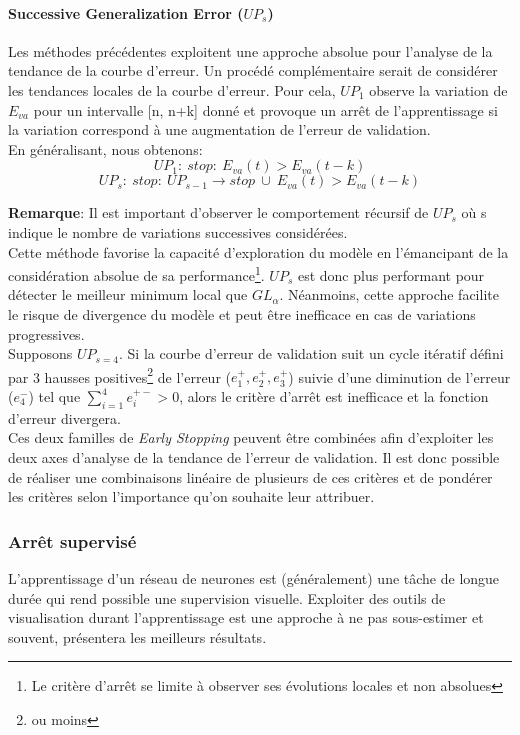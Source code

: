 \paragraph{Successive Generalization Error ($UP_s$)}
Les méthodes précédentes exploitent une approche absolue pour l'analyse de la tendance de la courbe d'erreur. Un procédé complémentaire serait de considérer les tendances locales de la courbe d'erreur. Pour cela, $UP_1$ observe la variation de $E_{va}$ pour un intervalle [n, n+k] donné et provoque un arrêt de l'apprentissage si la variation correspond à une augmentation de l'erreur de validation.\\

\noindent En généralisant, nous obtenons:
$$UP_1: \ stop: \ E_{va}(t) > E_{va}(t-k)$$
$$UP_s: \ stop: \ UP_{s-1} \rightarrow stop \ \cup \ E_{va}(t) > E_{va}(t-k)$$

\noindent \textbf{Remarque}: Il est important d'observer le comportement récursif de $UP_s$ où s indique le nombre de variations successives considérées.\\

\noindent Cette méthode favorise la capacité d'exploration du modèle en l'émancipant de la considération absolue de sa performance\footnote{Le critère d'arrêt se limite à observer ses évolutions locales et non absolues}. $UP_s$ est donc plus performant pour détecter le meilleur minimum local que $GL_{\alpha}$. Néanmoins, cette approche facilite le risque de divergence du modèle et peut être inefficace en cas de variations progressives.\\

\noindent Supposons $UP_{s=4}$. Si la courbe d'erreur de validation suit un cycle itératif défini par 3 hausses positives\footnote{ou moins} de l'erreur ($e_1^+, e_2^+, e_3^+$) suivie d'une diminution de l'erreur ($e_4^-$) tel que $\sum_{i=1}^4 e_i^{+-}>0$, alors le critère d'arrêt est inefficace et la fonction d'erreur divergera.\\

\noindent Ces deux familles de \textit{Early Stopping} peuvent être combinées afin d'exploiter les deux axes d'analyse de la tendance de l'erreur de validation. Il est donc possible de réaliser une combinaisons linéaire de plusieurs de ces critères et de pondérer les critères selon l'importance qu'on souhaite leur attribuer.\\

\subsubsection{Arrêt supervisé}
\noindent L'apprentissage d'un réseau de neurones est (généralement) une tâche de longue durée qui rend possible une supervision visuelle. Exploiter des outils de visualisation durant l'apprentissage est une approche à ne pas sous-estimer et souvent, présentera les meilleurs résultats.\\

